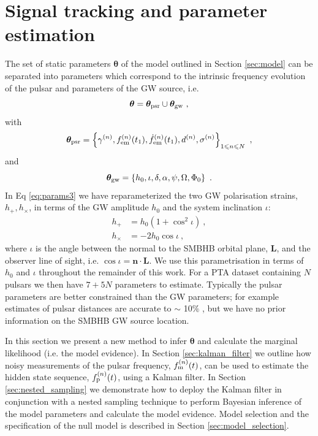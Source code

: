 \documentclass[fleqn,usenatbib,useAMS]{mnras}
\begin{document}
\section{Signal tracking and parameter estimation} \label{sec:detect}
The set of static parameters $\boldsymbol{\theta}$ of the model outlined in Section \ref{sec:model} can be separated into parameters which correspond to the intrinsic frequency evolution of the pulsar and parameters of the GW source, i.e. 
\begin{equation}
	\boldsymbol{\theta} =  \boldsymbol{\theta}_{\rm psr} \cup \boldsymbol{\theta}_{\rm gw} \ , \label{eq:params1}
\end{equation}
with
\begin{equation}
	\boldsymbol{\theta}_{\rm psr} = \left \{ \gamma^{(n)}, f_{\rm em}^{(n)}(t_1),\dot{f}_{\rm em}^{(n)}(t_1),d^{(n)},\sigma^{(n)}\right\}_{1\leq n \leq N} \ ,
\end{equation}
and
\begin{equation}
	\boldsymbol{\theta}_{\rm gw} = \left \{h_0, \iota, \delta, \alpha, \psi, \Omega, \Phi_0 \right \} \ .  \label{eq:params3}
\end{equation}
In Eq \ref{eq:params3} we have reparameterized the two GW polarisation strains, $h_{+}, h_{\times}$, in terms of the GW amplitude $h_0$ and the system inclination $\iota$:
\begin{align}
	h_+ &= h_0(1 + \cos^2 \iota) 	\label{eq:hphx} \ ,\\
	h_{\times} &= -2h_0\cos \iota 	\label{eq:hphx2} \ , 
\end{align}
where $\iota$ is the angle between the normal to the SMBHB orbital plane, $\boldsymbol{L}$, and the observer line of sight, i.e. $\cos \iota = \boldsymbol{n} \cdot \boldsymbol{L}$. We use this parametrisation in terms of $h_0$ and $\iota$ throughout the remainder of this work. For a PTA dataset containing $N$ pulsars we then have $7 + 5N$ parameters to estimate. Typically the pulsar parameters are better constrained than the GW parameters; for example estimates of pulsar distances are accurate to $\sim$ 10$\%$ \citep{Cordes2002astro.ph..7156C, Verbiest2012ApJ...755...39V, Desvignes2016,Yao2017}, but we have no prior information on the SMBHB GW source location.  \newline 



In this section we present a new method to infer $\boldsymbol{\theta}$ and calculate the marginal likelihood (i.e. the model evidence). In Section \ref{sec:kalman_filter} we outline how noisy measurements of the pulsar frequency, $f_{\rm m}^{(n)}(t)$, can be used to estimate the hidden state sequence, $f_{\rm p}^{(n)}(t)$, using a Kalman filter. In Section \ref{sec:nested_sampling} we demonstrate how to deploy the Kalman filter in conjunction with a nested sampling technique to perform Bayesian inference of the model parameters and calculate the model evidence. Model selection and the specification of the null model is described in Section \ref{sec:model_selection}. 
\end{document}
